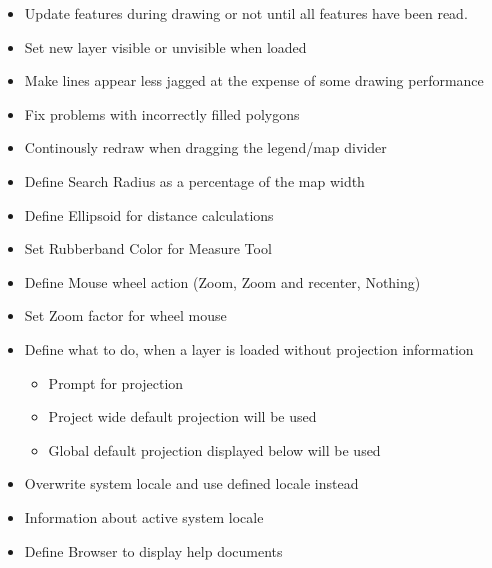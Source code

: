 \begin{itemize}
\item Update features during drawing or not until all features have been read.
\item Set new layer visible or unvisible when loaded 
\item Make lines appear less jagged at the expense of some drawing performance
\item Fix problems with incorrectly filled polygons
\item Continously redraw when dragging the legend/map divider 
\end{itemize}


\begin{itemize}
\item Define Search Radius as a percentage of the map width
\item Define Ellipsoid for distance calculations
\item Set Rubberband Color for Measure Tool
\item Define Mouse wheel action (Zoom, Zoom and recenter, Nothing)
\item Set Zoom factor for wheel mouse
\end{itemize}


\begin{itemize}
\item Define what to do, when a layer is loaded without projection information
\begin{itemize}
\item Prompt for projection
\item Project wide default projection will be used
\item Global default projection displayed below will be used
\end{itemize}
\end{itemize}


\begin{itemize}
\item Overwrite system locale and use defined locale instead
\item Information about active system locale
\end{itemize}


\begin{itemize}
\item Define Browser to display help documents
\end{itemize}


